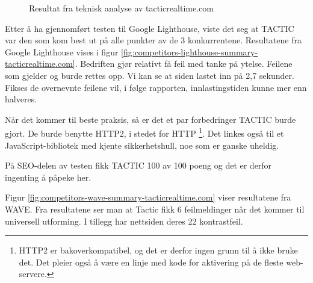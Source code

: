 \begin{figure}[H]
    \begin{center}
        \label{fig:competitors-tech_analysis-tacticrealtime.com}
        \caption{Resultat fra teknisk analyse av tacticrealtime.com}
    \end{center}
\end{figure}

Etter å ha gjennomført testen til Google Lighthouse, viste det seg at TACTIC var den som kom best ut på alle punkter av de 3 konkurrentene. Resultatene fra Google Lighthouse vises i figur \ref{fig:competitors-lighthouse-summary-tacticrealtime.com}. Bedriften gjør relativt få feil med tanke på ytelse. Feilene som gjelder  og  burde rettes opp. Vi kan se at siden lastet inn på 2,7 sekunder. Fikses de overnevnte feilene vil, i følge rapporten, innlastingstiden kunne mer enn halveres.

Når det kommer til beste praksis, så er det et par forbedringer TACTIC burde gjort. De burde benytte HTTP2, i stedet for HTTP \footnote{HTTP2 er bakoverkompatibel, og det er derfor ingen grunn til å ikke bruke det. Det pleier også å være en linje med kode for aktivering på de fleste web-servere.}. Det linkes også til et JavaScript-bibliotek med kjente sikkerhetshull, noe som er ganske uheldig.

På SEO-delen av testen fikk TACTIC 100 av 100 poeng og det er derfor ingenting å påpeke her.

Figur \ref{fig:competitors-wave-summary-tacticrealtime.com} viser resultatene fra WAVE. Fra resultatene ser man at Tactic fikk 6 feilmeldinger når det kommer til universell utforming. I tillegg har nettsiden deres 22 kontrastfeil. 

